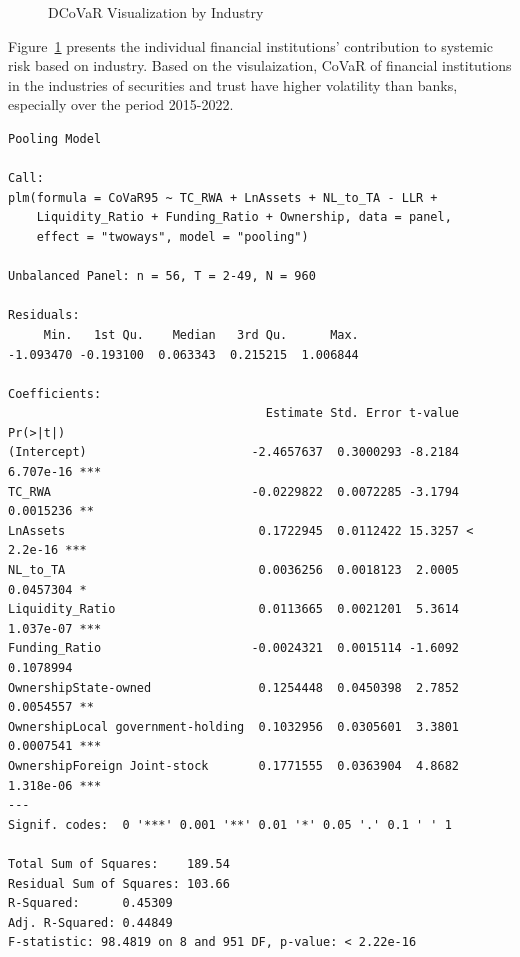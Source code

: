 \documentclass[
  12pt,
  a4paper,
]{scrreprt}
\begin{document}
{{{{\begin{figure}
{}

\caption{\label{fig-CoVaRindustry}DCoVaR Visualization by Industry}

\end{figure}%

Figure~\ref{fig-CoVaRindustry} presents the individual financial
institutions' contribution to systemic risk based on industry. Based on
the visulaization, CoVaR of financial institutions in the industries of
securities and trust have higher volatility than banks, especially over
the period 2015-2022.

\begin{verbatim}
Pooling Model

Call:
plm(formula = CoVaR95 ~ TC_RWA + LnAssets + NL_to_TA - LLR + 
    Liquidity_Ratio + Funding_Ratio + Ownership, data = panel, 
    effect = "twoways", model = "pooling")

Unbalanced Panel: n = 56, T = 2-49, N = 960

Residuals:
     Min.   1st Qu.    Median   3rd Qu.      Max. 
-1.093470 -0.193100  0.063343  0.215215  1.006844 

Coefficients:
                                    Estimate Std. Error t-value  Pr(>|t|)    
(Intercept)                       -2.4657637  0.3000293 -8.2184 6.707e-16 ***
TC_RWA                            -0.0229822  0.0072285 -3.1794 0.0015236 ** 
LnAssets                           0.1722945  0.0112422 15.3257 < 2.2e-16 ***
NL_to_TA                           0.0036256  0.0018123  2.0005 0.0457304 *  
Liquidity_Ratio                    0.0113665  0.0021201  5.3614 1.037e-07 ***
Funding_Ratio                     -0.0024321  0.0015114 -1.6092 0.1078994    
OwnershipState-owned               0.1254448  0.0450398  2.7852 0.0054557 ** 
OwnershipLocal government-holding  0.1032956  0.0305601  3.3801 0.0007541 ***
OwnershipForeign Joint-stock       0.1771555  0.0363904  4.8682 1.318e-06 ***
---
Signif. codes:  0 '***' 0.001 '**' 0.01 '*' 0.05 '.' 0.1 ' ' 1

Total Sum of Squares:    189.54
Residual Sum of Squares: 103.66
R-Squared:      0.45309
Adj. R-Squared: 0.44849
F-statistic: 98.4819 on 8 and 951 DF, p-value: < 2.22e-16
\end{verbatim}

\begin{longtable}[]{@{}
  >{\centering\arraybackslash}p{}
  >{\centering\arraybackslash}p{}
  >{\centering\arraybackslash}p{}@{}}


\end{longtable}}}}}
\end{document}
